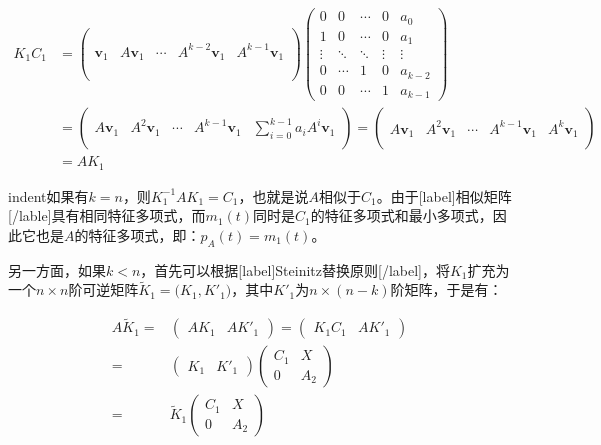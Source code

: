 \documentclass[UTF8,nofonts]{ctexart}
\begin{document}
\[
\begin{aligned}
K_1C_1&=\begin{pmatrix}
& & & & \\
& & & & \\
\boldsymbol{v}_1 & A\boldsymbol{v}_1 & \cdots & A^{k-2}\boldsymbol{v}_1 & A^{k-1}\boldsymbol{v}_1 \\
& & & & \\
& & & & \\
\end{pmatrix}
\begin{pmatrix}
0 & 0 & \cdots & 0 & a_0 \\
1 & 0 & \cdots & 0 & a_1 \\
\vdots & \ddots & \ddots & \vdots & \vdots \\
0 & \cdots & 1 & 0 & a_{k-2} \\
0 & 0 & \cdots & 1 & a_{k-1}
\end{pmatrix} \\
&=\begin{pmatrix}
& & & & \\
A\boldsymbol{v}_1 & A^2\boldsymbol{v}_1 & \cdots & A^{k-1}\boldsymbol{v}_1 & \displaystyle{\sum_{i=0}^{k-1}a_iA^i\boldsymbol{v}_1} \\
& & & & 
\end{pmatrix}=\begin{pmatrix}
& & & & \\
A\boldsymbol{v}_1 & A^2\boldsymbol{v}_1 & \cdots & A^{k-1}\boldsymbol{v}_1 & A^k\boldsymbol{v}_1 \\
& & & & 
\end{pmatrix} \\
&=AK_1
\end{aligned}
\]

indent如果有$k=n$，则$K_1^{-1}AK_1=C_1$，也就是说$A$相似于$C_1$。由于[label]相似矩阵[/lable]具有相同特征多项式，而$m_1(t)$同时是$C_1$的特征多项式和最小多项式，因此它也是$A$的特征多项式，即：$p_A(t)=m_1(t)$。

另一方面，如果$k<n$，首先可以根据[label]Steinitz替换原则[/label]，将$K_1$扩充为一个$n \times n$阶可逆矩阵$\tilde{K}_1=\big(K_1,K'_1\big)$，其中$K'_1$为$n \times (n-k)$阶矩阵，于是有：

\[
\begin{aligned}
A\tilde{K}_1=&
\begin{pmatrix}AK_1&AK'_1\end{pmatrix}=
\begin{pmatrix}K_1C_1&A{K}'_1\end{pmatrix} \\
=&\begin{pmatrix}K_1&{K}'_1\end{pmatrix}\begin{pmatrix}C_1&X\\0&A_2\end{pmatrix} \\
=&\tilde{K}_1\begin{pmatrix}C_1&X\\0&A_2\end{pmatrix}
\end{aligned}
\]
\end{document}
